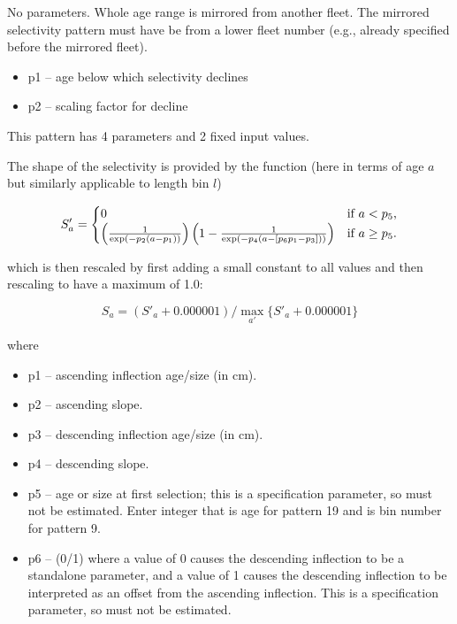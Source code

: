 No parameters.  Whole age range is mirrored from another fleet. The mirrored selectivity pattern must have be from a lower fleet number (e.g., already specified before the mirrored fleet).

	\begin{itemize}
		\item p1 – age below which selectivity declines
		\item p2 – scaling factor for decline
	\end{itemize}



This pattern has 4 parameters and 2 fixed input values.

The shape of the selectivity is provided by the function (here in terms of age $a$ but similarly applicable to length bin $l$)

\begin{equation}
    S'_a =  
    \begin{cases}
      \hfil 0 & \text{if $a < p_5$,} \\
      \left( \frac{1}{\exp\left(-p_2 \left( a - p_1 \right) \right) } \right)
      \left(1 - \frac{1}{\exp\left(-p_4 \left( a - [p_6 p_1 - p_3]\right) \right) } \right)
      & \text{if $a \geq p_5$.}
    \end{cases}
 \end{equation}

 which is then rescaled by first adding a small constant to all values and then rescaling to have a maximum of 1.0:
 
 \begin{equation}
    S_a = (S'_a + 0.000001) / \max_{a'}\{S'_a + 0.000001\}
 \end{equation}

  where
	\begin{itemize}
		\item p1 – ascending inflection age/size (in cm).
		\item p2 – ascending slope. 
		\item p3 – descending inflection age/size (in cm).
		\item p4 – descending slope.
		\item p5 – age or size at first selection; this is a specification parameter, so must not be estimated.  Enter integer that is age for pattern 19 and is bin number for pattern 9.
		\item p6 – (0/1)  where a value of 0 causes the descending inflection to be a standalone parameter, and a value of 1 causes the descending inflection to be interpreted as an offset from the ascending inflection.  This is a specification parameter, so must not be estimated.
	\end{itemize}

